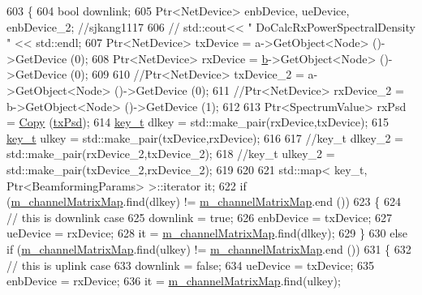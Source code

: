 \begin{DoxyCode}
603 \{
604         \textcolor{keywordtype}{bool} downlink;
605         Ptr<NetDevice> enbDevice, ueDevice, enbDevice\_2; \textcolor{comment}{//sjkang1117}
606 \textcolor{comment}{//      std::cout<< " DoCalcRxPowerSpectralDensity  "  << std::endl;}
607         Ptr<NetDevice> txDevice = a->GetObject<Node> ()->GetDevice (0);
608         Ptr<NetDevice> rxDevice = \hyperlink{buildings__pathloss_8m_a21ad0bd836b90d08f4cf640b4c298e7c}{b}->GetObject<Node> ()->GetDevice (0);
609 
610         \textcolor{comment}{//Ptr<NetDevice> txDevice\_2 = a->GetObject<Node> ()->GetDevice (0);}
611         \textcolor{comment}{//Ptr<NetDevice> rxDevice\_2 = b->GetObject<Node> ()->GetDevice (1);}
612 
613         Ptr<SpectrumValue> rxPsd = \hyperlink{namespacens3_a952d99f6d759fee74dda19f308451bc1}{Copy} (\hyperlink{lte__link__budget_8m_a684fe3101a5e48a5fcc57cab8dbcd1aa}{txPsd});
614         \hyperlink{namespacens3_aa42bd408e172586b3b192acfaa36b070}{key\_t} dlkey = std::make\_pair(rxDevice,txDevice);
615         \hyperlink{namespacens3_aa42bd408e172586b3b192acfaa36b070}{key\_t} ulkey = std::make\_pair(txDevice,rxDevice);
616 
617         \textcolor{comment}{//key\_t dlkey\_2 = std::make\_pair(rxDevice\_2,txDevice\_2);}
618         \textcolor{comment}{//key\_t ulkey\_2 = std::make\_pair(txDevice\_2,rxDevice\_2);}
619 
620 
621         std::map< key\_t, Ptr<BeamformingParams> >::iterator it;
622         \textcolor{keywordflow}{if} (\hyperlink{classns3_1_1MmWaveBeamforming_a934e34478d7bb32f34ed64ef2e66728b}{m\_channelMatrixMap}.find(dlkey) != 
      \hyperlink{classns3_1_1MmWaveBeamforming_a934e34478d7bb32f34ed64ef2e66728b}{m\_channelMatrixMap}.end ())
623         \{
624                 \textcolor{comment}{// this is downlink case}
625                 downlink = \textcolor{keyword}{true};
626                 enbDevice = txDevice;
627                 ueDevice = rxDevice;
628                 it = \hyperlink{classns3_1_1MmWaveBeamforming_a934e34478d7bb32f34ed64ef2e66728b}{m\_channelMatrixMap}.find(dlkey);
629         \}
630         \textcolor{keywordflow}{else} \textcolor{keywordflow}{if} (\hyperlink{classns3_1_1MmWaveBeamforming_a934e34478d7bb32f34ed64ef2e66728b}{m\_channelMatrixMap}.find(ulkey) != 
      \hyperlink{classns3_1_1MmWaveBeamforming_a934e34478d7bb32f34ed64ef2e66728b}{m\_channelMatrixMap}.end ())
631         \{
632                 \textcolor{comment}{// this is uplink case}
633                 downlink = \textcolor{keyword}{false};
634                 ueDevice = txDevice;
635                 enbDevice = rxDevice;
636                 it = \hyperlink{classns3_1_1MmWaveBeamforming_a934e34478d7bb32f34ed64ef2e66728b}{m\_channelMatrixMap}.find(ulkey);

\end{DoxyCode}
